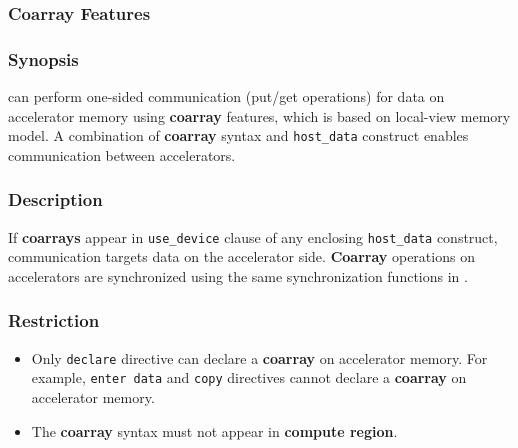 \subsubsection{Coarray Features} \label{sec:coarray}
\subsubsection*{Synopsis}
{\XACC} can perform one-sided communication (put/get operations) for data on accelerator memory using {\bf coarray} features,
which is based on {\XMP} local-view memory model.
A combination of {\bf coarray} syntax and {\tt host\_data} construct enables communication between accelerators.

\subsubsection*{Description}
If {\bf coarrays} appear in {\tt use\_device} clause of any enclosing {\tt host\_data} construct, 
communication targets data on the accelerator side. 
{\bf Coarray} operations on accelerators are synchronized using the same synchronization functions in {\XMP}.

\subsubsection*{Restriction}
\begin{itemize}
 \item Only {\tt declare} directive can declare a {\bf coarray} on accelerator memory.
   For example,
   {\tt enter data} and {\tt copy} directives cannot declare a {\bf coarray} on accelerator memory.
 \item The {\bf coarray} syntax must not appear in {\OACC} {\bf compute region}.
\end{itemize}

